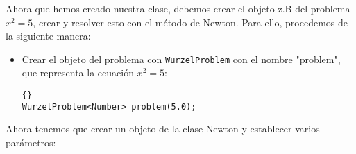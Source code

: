 \noindent
Ahora que hemos creado nuestra clase, debemos crear el objeto z.B del problema 
$x^2=5$, crear y resolver esto con el método de Newton.  Para ello,
procedemos de la siguiente manera:

\begin{itemize}
  \item Crear el objeto del problema con \lstinline{WurzelProblem} con el nombre
     "problem", que representa la ecuación $x^2=5$:

  {\footnotesize{\begin{lstlisting}{}
WurzelProblem<Number> problem(5.0);
\end{lstlisting}}}
\end{itemize}

\noindent
Ahora tenemos que crear un objeto de la clase Newton y establecer varios parámetros:

